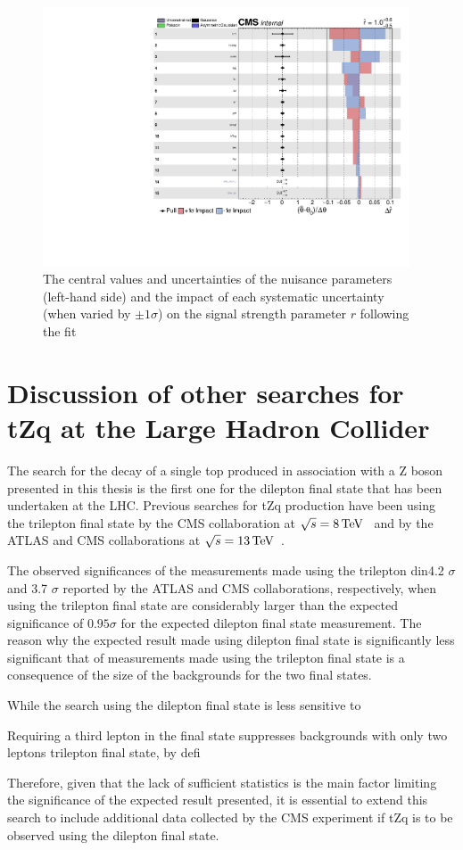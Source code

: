 \begin{figure}[htbp]
\begin{center}
\includegraphics[width=0.97\textwidth]{figs/results/systematicsImpact.pdf}
\caption{The central values and uncertainties of the nuisance parameters (left-hand side) and the impact of each systematic uncertainty (when varied by $\pm 1 \sigma$) on the signal strength parameter $r$ following the fit
}
\label{fig:systematicsPull}
\end{center}
\end{figure}

\section{Discussion of other searches for tZq at the Large Hadron Collider}
The search for the decay of a single top produced in association with a Z boson presented in this thesis is the first one for the dilepton final state that has been undertaken at the LHC.
Previous searches for tZq production have been using the trilepton final state by the CMS collaboration at $\sqrt{s} = 8 \,\text{Te\hspace{-.08em}V}$~\cite{Sirunyan:2017kkr} and by the ATLAS and CMS collaborations at $\sqrt{s} = 13 \,\text{Te\hspace{-.08em}V}$~\cite{Aaboud:2017ylb,Sirunyan:2017nbr}.

The observed significances of the measurements made using the trilepton din4.2 $\sigma$ and 3.7 $\sigma$ reported by the ATLAS and CMS collaborations, respectively, when using the trilepton final state are considerably larger than the expected significance of $0.95 \sigma$ for the expected dilepton final state measurement.
The reason why the expected result made using dilepton final state is significantly less significant that of measurements made using the trilepton final state is a consequence of the size of the backgrounds for the two final states.

While the search using the dilepton final state is less sensitive to 

Requiring a third lepton in the final state suppresses backgrounds with only two leptons trilepton final state, by defi

Therefore, given that the lack of sufficient statistics is the main factor limiting the significance of the expected result presented, it is essential to extend this search to include additional data collected by the CMS experiment if tZq is to be observed using the dilepton final state.